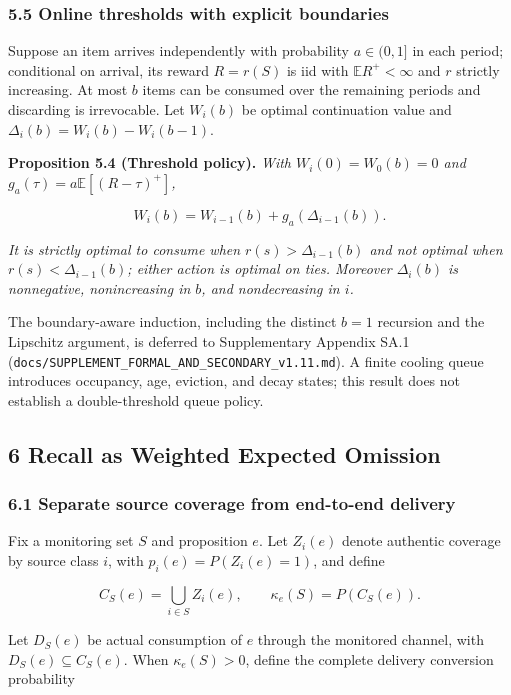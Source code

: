 \documentclass[
  11pt]{article}
\begin{document}
\subsubsection{5.5 Online thresholds with explicit
boundaries}\label{online-thresholds-with-explicit-boundaries}

Suppose an item arrives independently with probability \(a\in(0,1]\) in
each period; conditional on arrival, its reward \(R=r(S)\) is iid with
\(\mathbb E R^+<\infty\) and \(r\) strictly increasing. At most \(b\)
items can be consumed over the remaining periods and discarding is
irrevocable. Let \(W_i(b)\) be optimal continuation value and
\(\Delta_i(b)=W_i(b)-W_i(b-1)\).

\textbf{Proposition 5.4 (Threshold policy).} \emph{With
\(W_i(0)=W_0(b)=0\) and \(g_a(\tau)=a\mathbb E[(R-\tau)^+]\),}

\[W_i(b)=W_{i-1}(b)+g_a(\Delta_{i-1}(b)).\]

\emph{It is strictly optimal to consume when \(r(s)>\Delta_{i-1}(b)\)
and not optimal when \(r(s)<\Delta_{i-1}(b)\); either action is optimal
on ties. Moreover \(\Delta_i(b)\) is nonnegative, nonincreasing in
\(b\), and nondecreasing in \(i\).}

The boundary-aware induction, including the distinct \(b=1\) recursion
and the Lipschitz argument, is deferred to Supplementary Appendix SA.1
(\texttt{docs/SUPPLEMENT\_FORMAL\_AND\_SECONDARY\_v1.11.md}). A finite
cooling queue introduces occupancy, age, eviction, and decay states;
this result does not establish a double-threshold queue policy.

\subsection{6 Recall as Weighted Expected
Omission}\label{recall-as-weighted-expected-omission}

\subsubsection{6.1 Separate source coverage from end-to-end
delivery}\label{separate-source-coverage-from-end-to-end-delivery}

Fix a monitoring set \(S\) and proposition \(e\). Let \(Z_i(e)\) denote
authentic coverage by source class \(i\), with \(p_i(e)=P(Z_i(e)=1)\),
and define

\[C_S(e)=\bigcup_{i\in S}Z_i(e),\qquad \kappa_e(S)=P(C_S(e)).\]

Let \(D_S(e)\) be actual consumption of \(e\) through the monitored
channel, with \(D_S(e)\subseteq C_S(e)\). When \(\kappa_e(S)>0\), define
the complete delivery conversion probability
\end{document}
